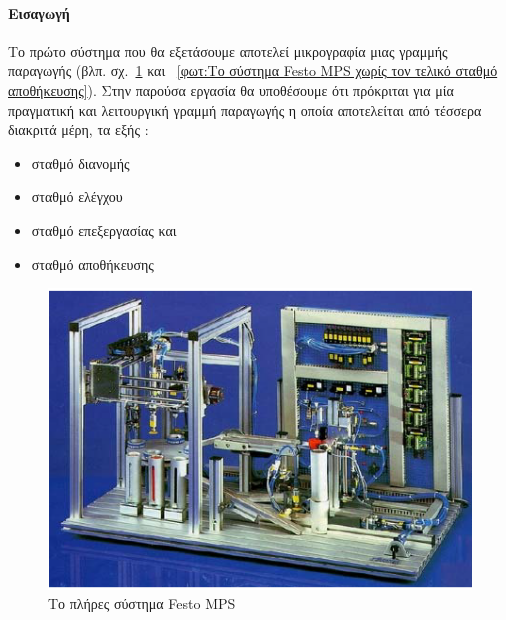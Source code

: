 \documentclass[a4paper,12pt,twoside]{report}
\begin{document}
{			\paragraph{Εισαγωγή} {Το πρώτο σύστημα που θα εξετάσουμε αποτελεί μικρογραφία μιας γραμμής παραγωγής {\footnotesize (βλπ. σχ.~\ref{φωτ:Το πλήρες σύστημα Festo MPS} και ~\ref{φωτ:Το σύστημα Festo MPS χωρίς τον τελικό σταθμό αποθήκευσης})}. Στην παρούσα εργασία θα υποθέσουμε ότι πρόκριται για μία πραγματική και λειτουργική γραμμή παραγωγής η οποία αποτελείται από τέσσερα διακριτά μέρη, τα εξής :
			}
			\begin{itemize}
				\item σταθμό διανομής
				\item σταθμό ελέγχου
				\item σταθμό επεξεργασίας και
				\item σταθμό αποθήκευσης
			\end{itemize}
			
			\begin{figure}[hp]
					\centering
					\includegraphics[scale=0.75]{FestoMPSSystem2.png}
					\caption{Το πλήρες σύστημα Festo MPS\textregistered}
					\label{φωτ:Το πλήρες σύστημα Festo MPS}
			\end{figure}
			
}
\end{document}
